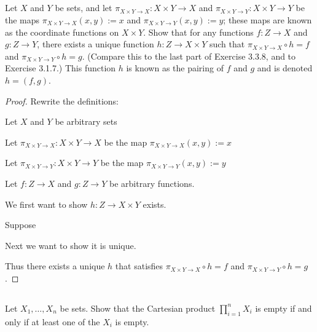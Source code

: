 \documentclass[../../main.tex]{subfiles}
\begin{document}
\addtocounter{subsection}{2}
\subsection{}
\begin{q}
    Let $X$ and $Y$ be sets, and let $\pi_{X\times Y\to X} : X \times Y \to X$ and $\pi_{X\times Y\to Y} : X \times Y \to Y$ be the maps $\pi_{X\times Y\to X}(x, y) := x$ and $\pi_{X\times Y\to Y}(x, y) := y$; these maps are known as the coordinate functions on $X\times Y$. Show that for any functions $f : Z \to X$ and $g : Z \to Y$, there exists a unique function $h : Z \to X \times Y$ such that $\pi_{X\times Y\to X} \circ h = f$ and $\pi_{X\times Y\to Y} \circ h = g$. (Compare this to the last part of Exercise 3.3.8, and to Exercise 3.1.7.) This function $h$ is known as the pairing of $f$ and $g$ and is denoted $h = (f, g)$.
\end{q}

\begin{proof}
    Rewrite the definitions:
    \begin{lxl}
        \item Let $X$ and $Y$ be arbitrary sets
        \item Let $\pi_{X\times Y\to X} : X \times Y \to X$ be the map $\pi_{X\times Y\to X}(x, y) := x$
        \item Let $\pi_{X\times Y\to Y} : X \times Y \to Y$ be the map $\pi_{X\times Y\to Y}(x, y) := y$
        \item Let $f : Z \to X$ and $g : Z \to Y$ be arbitrary functions.
    \end{lxl}
    We first want to show $h : Z \to X \times Y$ exists.
    \begin{lxl}[resume]
        \item Suppose 
    \end{lxl}
    Next we want to show it is unique.
    \begin{lxl}[resume]
        \item
    \end{lxl}
    Thus there exists a unique $h$ that satisfies $\pi_{X\times Y\to X} \circ h = f$ and $\pi_{X\times Y\to Y} \circ h = g$.
\end{proof}
\begin{xx}
    
\end{xx}

\subsection{}
\begin{q}
    Let $X_1, \ldots, X_n$ be sets. Show that the Cartesian product $\prod_{i=1}^n X_i$ is empty if and only if at least one of the $X_i$ is empty.
\end{q}
\end{document}
